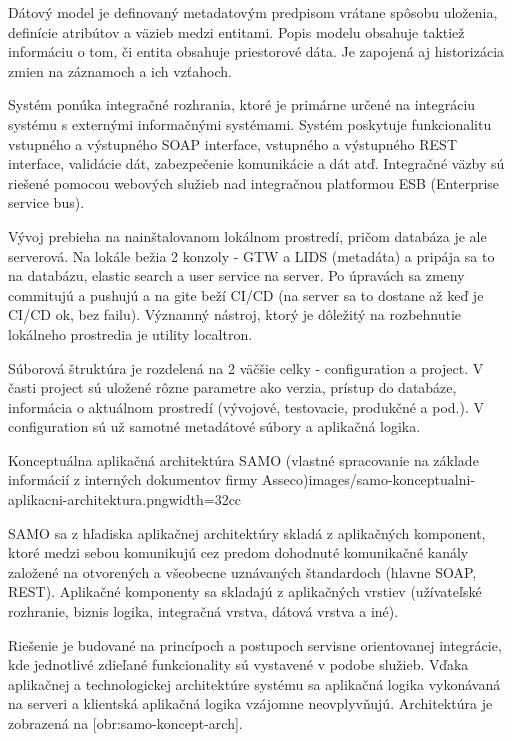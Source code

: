 Dátový model je definovaný metadatovým predpisom vrátane spôsobu uloženia, definície atribútov a väzieb medzi entitami. Popis modelu obsahuje taktiež informáciu o tom, či entita obsahuje priestorové dáta. Je zapojená aj historizácia zmien na záznamoch a ich vzťahoch.

Systém ponúka integračné rozhrania, ktoré je primárne určené na integráciu systému s externými informačnými systémami. Systém poskytuje funkcionalitu vstupného a výstupného SOAP interface, vstupného a výstupného REST interface, validácie dát, zabezpečenie komunikácie a dát atď. Integračné väzby sú riešené pomocou webových služieb nad integračnou platformou ESB (Enterprise service bus). 

Vývoj prebieha na nainštalovanom lokálnom prostredí, pričom databáza je ale serverová. Na lokále bežia 2 konzoly - GTW a LIDS (metadáta) a pripája sa to na databázu, elastic search a user service na server. Po úpravách sa zmeny commitujú a pushujú a na gite beží CI/CD (na server sa to dostane až keď je CI/CD ok, bez failu). Významný nástroj, ktorý je dôležitý na rozbehnutie lokálneho prostredia je utility localtron. 

Súborová štruktúra je rozdelená na 2 väčšie celky - configuration a project. V časti project sú uložené rôzne parametre ako verzia, prístup do databáze, informácia o aktuálnom prostredí (vývojové, testovacie, produkčné a pod.). V configuration sú už samotné metadátové súbory a aplikačná logika.

{Konceptuálna aplikačná architektúra SAMO (vlastné spracovanie na základe informácií z interných dokumentov firmy Asseco)}{images/samo-konceptualni-aplikacni-architektura.png}{width=32cc}

SAMO sa z hľadiska aplikačnej architektúry skladá z aplikačných komponent, ktoré medzi sebou komunikujú cez predom dohodnuté komunikačné kanály založené na otvorených a všeobecne uznávaných štandardoch (hlavne SOAP, REST). Aplikačné komponenty sa skladajú z aplikačných vrstiev (užívateľské rozhranie, biznis logika, integračná vrstva, dátová vrstva a iné).

Riešenie je budované na princípoch a postupoch servisne orientovanej integrácie, kde jednotlivé zdieľané funkcionality sú vystavené v podobe služieb. Vďaka aplikačnej a technologickej architektúre systému sa aplikačná logika vykonávaná na serveri a klientská aplikačná logika vzájomne neovplyvňujú. Architektúra je zobrazená na [obr:samo-koncept-arch].

